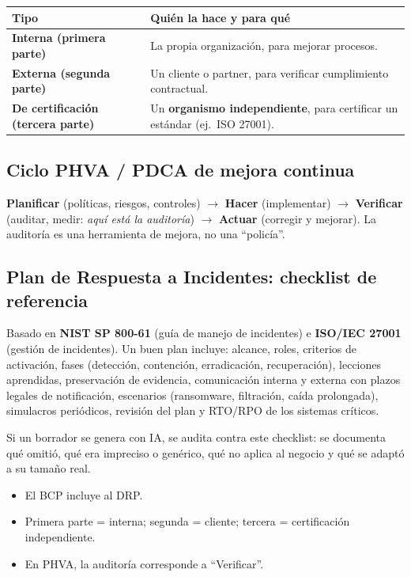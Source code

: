 \documentclass[12pt,a4paper]{article}
\begin{document}
\begin{tabularx}{\textwidth}{|>{\bfseries}p{4.4cm}|X|}
\hline
\rowcolor{grisClaro}
Tipo & Qui\'en la hace y para qu\'e \\
\hline
Interna (primera parte) & La propia organizaci\'on, para mejorar procesos. \\
\hline
Externa (segunda parte) & Un cliente o partner, para verificar cumplimiento contractual. \\
\hline
De certificaci\'on (tercera parte) & Un \textbf{organismo independiente}, para certificar un est\'andar (ej.\ ISO 27001). \\
\hline
\end{tabularx}

\subsection{Ciclo PHVA / PDCA de mejora continua}
\textbf{Planificar} (pol\'iticas, riesgos, controles) $\rightarrow$ \textbf{Hacer}
(implementar) $\rightarrow$ \textbf{Verificar} (auditar, medir: \emph{aqu\'i est\'a
la auditor\'ia}) $\rightarrow$ \textbf{Actuar} (corregir y mejorar). La auditor\'ia es
una herramienta de mejora, no una ``polic\'ia''.

\subsection{Plan de Respuesta a Incidentes: checklist de referencia}
Basado en \textbf{NIST SP 800-61} (gu\'ia de manejo de incidentes) e
\textbf{ISO/IEC 27001} (gesti\'on de incidentes). Un buen plan incluye: alcance,
roles, criterios de activaci\'on, fases (detecci\'on, contenci\'on, erradicaci\'on,
recuperaci\'on), lecciones aprendidas, preservaci\'on de evidencia, comunicaci\'on
interna y externa con plazos legales de notificaci\'on, escenarios (ransomware,
filtraci\'on, ca\'ida prolongada), simulacros peri\'odicos, revisi\'on del plan y
RTO/RPO de los sistemas cr\'iticos.

\begin{cajaIA}
Si un borrador se genera con IA, se audita contra este checklist: se documenta qu\'e
omiti\'o, qu\'e era impreciso o gen\'erico, qu\'e no aplica al negocio y qu\'e se
adapt\'o a su tama\~no real.
\end{cajaIA}

\begin{cajaResumen}
\begin{itemize}
  \item El BCP incluye al DRP.
  \item Primera parte = interna; segunda = cliente; tercera = certificaci\'on independiente.
  \item En PHVA, la auditor\'ia corresponde a ``Verificar''.
\end{itemize}
\end{cajaResumen}
\end{document}
